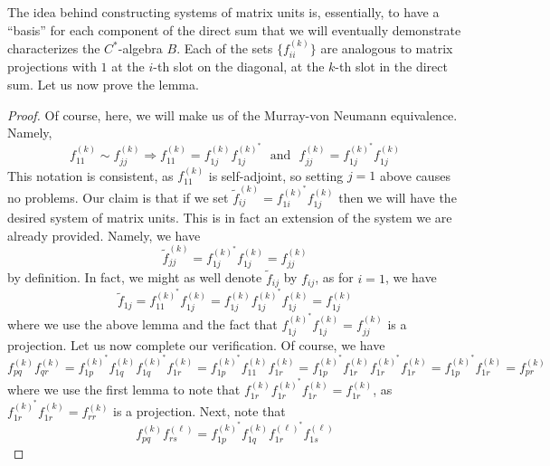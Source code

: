 \documentclass[aps,pra,showpacs,notitlepage,onecolumn,superscriptaddress,nofootinbib]{revtex4-1}
\theoremstyle{definition}
\begin{document}
\noindent The idea behind constructing systems of matrix units is, essentially, to have a ``basis'' for each component of the direct sum
that we will eventually demonstrate characterizes the $C^{*}$-algebra $B$. Each of the sets $\{f_{ii}^{(k)}\}$ are analogous to matrix projections
with $1$ at the $i$-th slot on the diagonal, at the $k$-th slot in the direct sum. Let us now prove the lemma.

\begin{proof}
  Of course, here, we will make us of the Murray-von Neumann equivalence. Namely,
  \begin{equation}
    f_{11}^{(k)} \sim f_{jj}^{(k)} \Longrightarrow f_{11}^{(k)} = f_{1j}^{(k)} f_{1j}^{(k)^{*}} \ \ \ \text{and} \ \ \ f_{jj}^{(k)} = f_{1j}^{(k)^{*}} f_{1j}^{(k)}
  \end{equation}
  This notation is consistent, as $f_{11}^{(k)}$ is self-adjoint, so setting $j = 1$ above causes no problems.
  Our claim is that if we set $\widetilde{f}_{ij}^{(k)} = f_{1i}^{(k)^{*}} f_{1j}^{(k)}$ then we will have the desired system of matrix units. This is in fact an extension of the system we are already provided. Namely, we have
  \begin{equation}
    \widetilde{f}_{jj}^{(k)} = f_{1j}^{(k)^{*}} f_{1j}^{(k)} = f_{jj}^{(k)}
  \end{equation}
  by definition. In fact, we might as well denote $\widetilde{f}_{ij}$ by $f_{ij}$, as for $i = 1$, we have
  \begin{equation}
    \widetilde{f}_{1j} = f_{11}^{(k)^{*}} f_{1j}^{(k)} = f_{1j}^{(k)} f_{1j}^{(k)^{*}} f_{1j}^{(k)} = f_{1j}^{(k)}
    \end{equation}
  where we use the above lemma and the fact that $f_{1j}^{(k)^{*}} f_{1j}^{(k)} = f_{jj}^{(k)}$ is a projection. Let us now complete our verification. Of course, we have
  \begin{equation}
    f_{pq}^{(k)} f_{qr}^{(k)} = f_{1p}^{(k)^{*}} f_{1q}^{(k)} f_{1q}^{(k)^{*}} f_{1r}^{(k)} = f_{1p}^{(k)^{*}} f_{11}^{(k)} f_{1r}^{(k)} = f_{1p}^{(k)^{*}} f_{1r}^{(k)} f_{1r}^{(k)^{*}} f_{1r}^{(k)} = f_{1p}^{(k)^{*}} f_{1r}^{(k)} = f_{pr}^{(k)}
  \end{equation}
  where we use the first lemma to note that $f_{1r}^{(k)} f_{1r}^{(k)^{*}} f_{1r}^{(k)} = f_{1r}^{(k)}$, as $f_{1r}^{(k)^{*}} f_{1r}^{(k)} = f_{rr}^{(k)}$ is a projection. Next, note that
  \begin{equation}
    f_{pq}^{(k)} f_{rs}^{(\ell)} = f_{1p}^{(k)^{*}} f_{1q}^{(k)} f_{1r}^{(\ell)^{*}} f_{1s}^{(\ell)}

\end{equation}
\end{proof}
\end{document}
